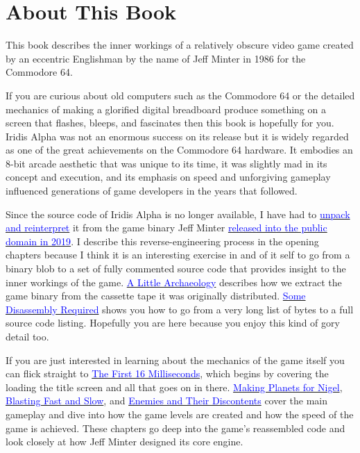 \chapter*{About This Book} 
This book describes the inner workings of a relatively obscure video game created
by an eccentric Englishman by the name of Jeff Minter in 1986 for the Commodore 64.

If you are curious about old computers such as the Commodore 64 or the detailed mechanics
of making a glorified digital breadboard produce something on a screen that flashes, bleeps,
and fascinates then this book is hopefully for you. Iridis Alpha was not an enormous success on its release
but it is widely regarded as one of the great achievements on the Commodore 64 hardware. It embodies an 8-bit arcade aesthetic that was
unique to its time, it was slightly mad in its concept and execution, and its emphasis on speed and unforgiving gameplay influenced
generations of game developers in the years that followed.

Since the source code of Iridis Alpha is no longer available, I have had to \href{https://github.com/mwenge/iridisalpha}{\textcolor{blue}{unpack and reinterpret}} it
from the game binary Jeff Minter \href{https://www.llamasoftarchive.org/oldsite/llamasoft/cbm64/IridisAlpha.zip}{\textcolor{blue}{released into the public domain in 2019}}. I describe this
reverse-engineering process in the opening chapters because I think it is an interesting exercise in and of it self to go from
a binary blob to a set of fully commented source code that provides insight to the inner workings of the game. 
\hyperref[sec:archaeo]{\textcolor{blue}{A Little Archaeology}} describes how we extract the game binary from the cassette
tape it was originally distributed. \hyperref[sec:disassembly]{\textcolor{blue}{Some Disassembly Required}} shows you how to go from 
a very long list of bytes to a full source code listing. Hopefully you are here because you enjoy this kind of gory detail too.

If you are just interested in learning about the mechanics of the game itself you can flick straight to \hyperref[sec:first16]{\textcolor{blue}{The First 16 Milliseconds}}, 
which begins by covering the loading the title screen and all that goes on in there. \hyperref[sec:planets]{\textcolor{blue}{Making Planets for Nigel}},
\hyperref[sec:blast]{\textcolor{blue}{Blasting Fast and Slow}}, and \hyperref[sec:level]{\textcolor{blue}{Enemies and Their Discontents}} cover the main gameplay
and dive into how the game levels are created and how the speed of the game is achieved. These chapters go deep into the game's reassembled code and look closely at how
Jeff Minter designed its core engine.


